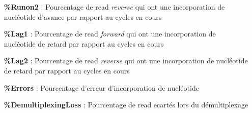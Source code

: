 \begin{itemize}
    \item[\textbf{\%Runon2} :] Pourcentage de read \emph{reverse} qui ont une incorporation de nucléotide d'avance par rapport au cycles en cours
    \item[\textbf{\%Lag1} :] Pourcentage de read \emph{forward} qui ont une incorporation de nucléotide de retard par rapport au cycles en cours
    \item[\textbf{\%Lag2} :] Pourcentage de read \emph{reverse} qui ont une incorporation de nucléotide de retard par rapport au cycles en cours
    \item[\textbf{\%Errors} :] Pourcentage d'erreur d'incorporation de nucléotide
    \item[\textbf{\%DemultiplexingLoss} :] Pourcentage de read ecartés lors du démultiplexage
\end{itemize}





